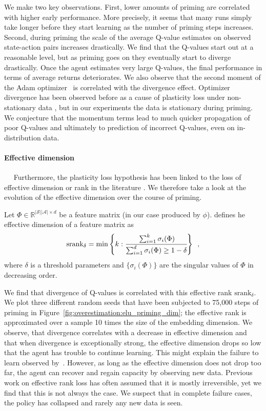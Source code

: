We make two key observations. First, lower amounts of priming are correlated with higher early performance. More precisely, it seems that many runs simply take longer before they start learning as the number of priming steps increases. Second, during priming the scale of the average Q-value estimates on observed state-action pairs increases drastically. We find that the Q-values start out at a reasonable level, but as priming goes on they eventually start to diverge drastically. Once the agent estimates very large Q-values, the final performance in terms of average returns deteriorates. We also observe that the second moment of the Adam optimizer~\parencite{kingma2015adam} is correlated with the divergence effect. Optimizer divergence has been observed before as a cause of plasticity loss under non-stationary data \parencite{lyle2023understanding}, but in our experiments the data is stationary during priming. We conjecture that the momentum terms lead to much quicker propagation of poor Q-values and ultimately to prediction of incorrect Q-values, even on in-distribution data.

\paragraph{Effective dimension}~~
Furthermore, the plasticity loss hypothesis has been linked to the loss of effective dimension or rank in the literature \parencite{kumar2021implicit}.
We therefore take a look at the evolution of the effective dimension over the course of priming.

Let $\Phi \in \mathbb{R}^{|\mathcal{S}| |\mathcal{A}| \times d}$ be a feature matrix (in our case produced by $\phi$). \textcite{yang2020harnessing} defines he effective dimension of a feature matrix as 
\begin{equation*}
    \text{srank}_{\delta} = \min 
    \left\{ k : \cfrac{\sum_{i=1}^k \sigma_i(\Phi)}{\sum_{i=1}^d \sigma_i(\Phi) \geq 1 - \delta}
    \right\} \enspace ,
\end{equation*}
where $\delta$ is a threshold parameters and $\{\sigma_i(\Phi)\}$ are the singular values of $\Phi$ in decreasing order.

We find that divergence of Q-values is correlated with this effective rank $\text{srank}_{\delta}$. We plot three different random seeds that have been subjected to 75,000 steps of priming in Figure~\ref{fig:overestimation:elu_priming_dim}; the effective rank is approximated over a sample 10 times the size of the embedding dimension. We observe, that divergence correlates with a decrease in effective dimension and that when divergence is exceptionally strong, the effective dimension drops so low that the agent has trouble to continue learning. This might explain the failure to learn observed by~\textcite{nikishin2022primacy}. However, as long as the effective dimension does not drop too far, the agent can recover and regain capacity by observing new data. 
Previous work on effective rank loss has often assumed that it is mostly irreversible, yet we find that this is not always the case.
We suspect that in complete failure cases, the policy has collapsed and rarely any new data is seen.

